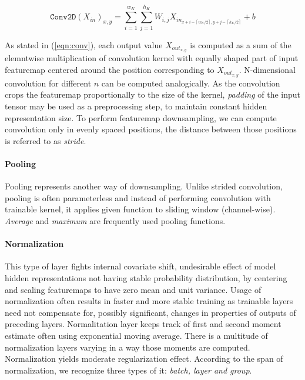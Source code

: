 \begin{equation} \label{eqn:conv}
\mathtt{Conv2D}(X_{in})_{x, y} =
    \sum\limits_{i=1}^{w_K}
    \sum\limits_{j=1}^{h_K}
    W_{i,j} X_{in_{x + i - \left\lceil w_K / 2 \right\rceil, y + j - \left\lceil h_K / 2 \right\rceil}} + b
\end{equation}

As stated in (\ref{eqn:conv}), each output value $X_{out_{x, y}}$ is computed as a sum of the elemntwise multiplication of convolution kernel with equally shaped part of input featuremap centered around the position corresponding to $X_{out_{x, y}}$. N-dimensional convolution for different $n$ can be computed analogically. As the convolution crops the featuremap proportionally to the size of the kernel, \emph{padding} of the input tensor may be used as a preprocessing step, to maintain constant hidden representation size. To perform featuremap downsampling, we can compute convolution only in evenly spaced positions, the distance between those positions is referred to as \emph{stride}.

\paragraph{Pooling}
Pooling represents another way of downsampling. Unlike strided convolution, pooling is often parameterless and instead of performing convolution with trainable kernel, it applies given function to sliding window (channel-wise). \emph{Average} and \emph{maximum} are frequently used pooling functions.

\paragraph{Normalization}
This type of layer fights internal covariate shift, undesirable effect of model hidden representations not having stable probability distribution, by centering and scaling featuremaps to have zero mean and unit variance. Usage of normalization often results in faster and more stable training as trainable layers need not compensate for, possibly significant, changes in properties of outputs of preceding layers. Normalitation layer keeps track of first and second moment estimate often using exponential moving average. There is a multitude of normalization layers varying in a way those moments are computed. Normalization yields moderate regularization effect. According to the span of normalization, we recognize three types of it: \emph{batch, layer and group}.

